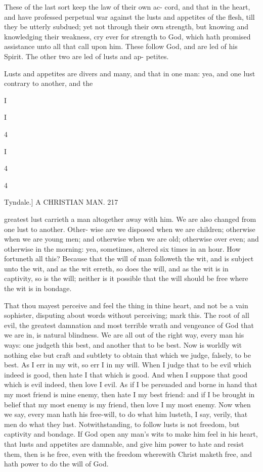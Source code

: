 \documentclass{custom}
\begin{document}
These of the last sort keep the law of their own ac- 
cord, and that in the heart, and have professed perpetual 
war against the lusts and appetites of the flesh, till they 
be utterly subdued; yet not through their own strength, 
but knowing and knowledging their weakness, cry ever 
for strength to God, which hath promised assistance 
unto all that call upon him. These follow God, and are 
led of his Spirit. The other two are led of lusts and ap- 
petites.

Lusts and appetites are divers and many, and that in 
one man: yea, and one lust contrary to another, and the 

I 

I 

4 

I 

4 

4 


Tyndale.] 
A CHRISTIAN MAN. 
217 

greatest lust carrieth a man altogether away with him. 
We are also changed from one lust to another. Other- 
wise are we disposed when we are children; otherwise 
when we are young men; and otherwise when we are old;
otherwise over even; and otherwise in the morning: yea, 
sometimes, altered six times in an hour. How fortuneth 
all this? Because that the will of man followeth the wit,
and is subject unto the wit, and as the wit erreth, so does 
the will, and as the wit is in captivity, so is the will; 
neither is it possible that the will should be free where the 
wit is in bondage. 

That thou mayest perceive and feel the thing in thine 
heart, and not be a vain sophister, disputing about words 
without perceiving; mark this. The root of all evil, the 
greatest damnation and most terrible wrath and vengeance 
of God that we are in, is natural blindness. We are all 
out of the right way, every man his ways: one judgeth 
this best, and another that to be best. Now is worldly
wit nothing else but craft and subtlety to obtain that which 
we judge, falsely, to be best. As I err in my wit, so err I
in my will. When I judge that to be evil which indeed
is good, then hate I that which is good. And when I 
suppose that good which is evil indeed, then love I evil. 
As if I be persuaded and borne in hand that my most 
friend is mine enemy, then hate I my best friend: and if 
I be brought in belief that my most enemy is my friend, 
then love I my most enemy. Now when we say, every 
man hath his free-will, to do what him lusteth, I say, 
verily, that men do what they lust. Notwithstanding, to 
follow lusts is not freedom, but captivity and bondage. 
If God open any man's wits to make him feel in his heart, 
that lusts and appetites are damnable, and give him power 
to hate and resist them, then is he free, even with the 
freedom wherewith Christ maketh free, and hath power 
to do the will of God. 
\end{document}
